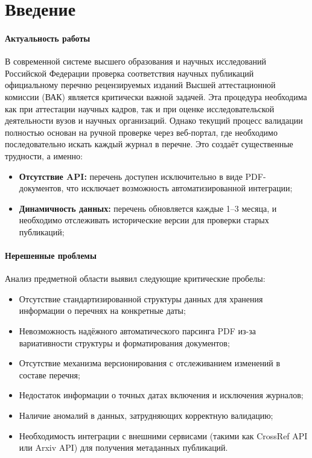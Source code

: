 \chapter*{Введение}
\label{sec:afterwords}

\subsubsection*{Актуальность работы}
В современной системе высшего образования и научных исследований Российской Федерации
проверка соответствия научных публикаций официальному перечню рецензируемых 
изданий Высшей аттестационной комиссии (ВАК) является критически важной
задачей. Эта процедура необходима как при аттестации научных кадров, так и при оценке
исследовательской деятельности вузов и научных организаций.
Однако текущий процесс валидации полностью основан на ручной проверке через веб-портал, 
где необходимо последовательно искать каждый журнал в перечне. Это создаёт существенные трудности, а именно:

\begin{itemize}
	\item \textbf{Отсутствие API:} перечень доступен исключительно в виде
	PDF-документов, что исключает возможность автоматизированной интеграции;
    \item \textbf{Динамичность данных:} перечень обновляется каждые 1–3 месяца, 
	и необходимо отслеживать исторические версии для проверки старых публикаций;
\end{itemize}

\subsubsection*{Нерешенные проблемы}

Анализ предметной области выявил следующие критические пробелы:

\begin{itemize}
	\item Отсутствие стандартизированной структуры данных для хранения информации о перечнях на конкретные даты;
	\item Невозможность надёжного автоматического парсинга PDF из-за вариативности структуры и форматирования документов;
	\item Отсутствие механизма версионирования с отслеживанием изменений в составе перечня;
	\item Недостаток информации о точных датах включения и исключения журналов;
	\item Наличие аномалий в данных, затрудняющих корректную валидацию;
	\item Необходимость интеграции с внешними сервисами (такими как CrossRef API или Arxiv API) для получения метаданных публикаций.
\end{itemize}

